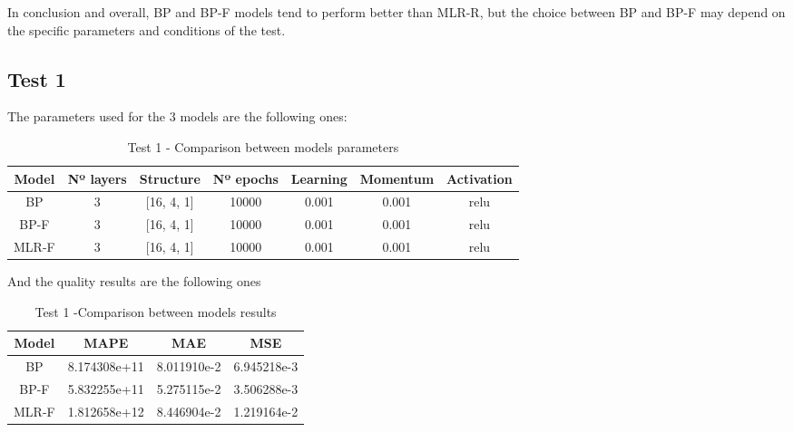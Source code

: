 \documentclass[11pt, a4paper]{article}
\begin{document}
\vspace{1em} In conclusion and overall, BP and BP-F models tend to perform better than MLR-R, but the choice between BP and BP-F may depend on the specific parameters 
and conditions of the test.

\subsection{Test 1}

The parameters used for the 3 models are the following ones:

\begin{table}[H]
    \centering
    \begin{tabular}{|c|c|c|c|c|c|c|}
        \hline
        \textbf{Model} & \textbf{Nº layers} & \textbf{Structure}  & \textbf{Nº epochs} & \textbf{Learning} & \textbf{Momentum} & \textbf{Activation} \\ \hline
        BP       & 3                & [16, 4, 1]    & 10000      & 0.001         & 0.001    & relu                \\ \hline
        BP-F     & 3                & [16, 4, 1]    & 10000      & 0.001         & 0.001    & relu                \\ \hline
        MLR-F    & 3                & [16, 4, 1]    & 10000      & 0.001         & 0.001    & relu              \\ \hline
    \end{tabular}
    \caption{Test 1 - Comparison between models parameters}
    \label{tab:table_parameters_comparison_1}
\end{table}

And the quality results are the following ones

\begin{table}[H]
    \centering
    \begin{tabular}{|c|c|c|c|}
        \hline
        \textbf{Model} & \textbf{MAPE}         & \textbf{MAE}         & \textbf{MSE}         \\ \hline
        BP & 8.174308e+11 & 8.011910e-2 & 6.945218e-3 \\ \hline
        BP-F & 5.832255e+11 & 5.275115e-2 & 3.506288e-3 \\ \hline
        MLR-F & 1.812658e+12 & 8.446904e-2 & 1.219164e-2 \\ \hline
    \end{tabular}
    \caption{Test 1 -Comparison between models results}
    \label{tab:table_results_comparison_1}
\end{table}
\end{document}

